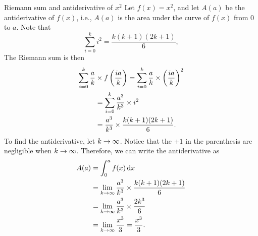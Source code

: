 \begin{exmp}{Riemann sum and antiderivative of \(x^2\)}{}
  Let \(f(x) = x^2\), and let \(A(a)\) be the antiderivative of \(f(x)\), i.e., \(A(a)\) is the area under the curve of \(f(x)\) from \(0\) to \(a\). Note that
  \begin{equation}
    \sum_{i = 0}^{k}i^2 = \frac{k(k + 1)(2k + 1)}{6},
  \end{equation}
  The Riemann sum is then
  \begin{align}
    \sum_{i = 0}^{k}\frac{a}{k} & \times f\left( i a \over k \right) = \sum_{i = 0}^k\frac{a}{k}\times \left(ia\over k\right)^2 \\
                                & = \sum_{i = 0}^k\frac{a^3}{k^3}\times i^2                                                     \\
                                & = \frac{a^3}{k^3}\times \frac{k(k + 1)(2k + 1)}{6}.
  \end{align}
  To find the antiderivative, let \(k \rightarrow \infty\). Notice that the \(+1\) in the parenthesis are negligible when \(k \rightarrow \infty\). Therefore, we can write the antiderivative as
  \begin{align}
    A(a) & = \int_0^a f(x)\odif{x}                                                 \\
         & = \lim_{k \appr \infty}\frac{a^3}{k^3}\times \frac{k(k + 1)(2k + 1)}{6} \\
         & = \lim_{k \appr \infty}\frac{a^3}{k^3}\times \frac{2k^3}{6}             \\
         & = \lim_{k \appr \infty}\frac{x^3}{3} = \frac{x^3}{3}.
  \end{align}
\end{exmp}

